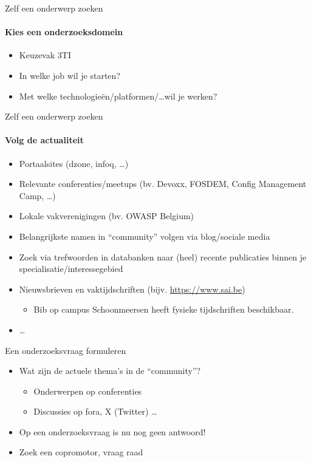 \documentclass[aspectratio=169]{beamer}
\begin{document}
\begin{frame}{Zelf een onderwerp zoeken}
  \framesubtitle{Kies een onderzoeksdomein}

  \begin{itemize}
    \item Keuzevak 3TI
    \item In welke job wil je starten?
    \item Met welke technologieën/platformen/\ldots wil je werken?
  \end{itemize}

\end{frame}

\begin{frame}{Zelf een onderwerp zoeken}
  \framesubtitle{Volg de actualiteit}

  \begin{itemize}
    \item Portaalsites (dzone, infoq, \ldots)
    \item Relevante conferenties/meetups (bv. Devoxx, FOSDEM, Config Management Camp, \ldots)
    \item Lokale vakverenigingen (bv. OWASP Belgium)
    \item Belangrijkste namen in ``community'' volgen via blog/sociale media
	\item Zoek via trefwoorden in databanken naar (heel) recente publicaties binnen je specialisatie/interessegebied
    \item Nieuwsbrieven en vaktijdschriften (bijv. \url{https://www.sai.be})
    \begin{itemize}
    	\item Bib op campus Schoonmeersen heeft fysieke tijdschriften beschikbaar.
    \end{itemize}
    \item \ldots
  \end{itemize}

\end{frame}

\begin{frame}{Een onderzoeksvraag formuleren}

  \begin{itemize}
    \item Wat zijn de actuele thema's in de ``community''?
          \begin{itemize}
            \item Onderwerpen op conferenties
            \item Discussies op fora, X (Twitter) \ldots
          \end{itemize}
    \item Op een onderzoeksvraag is nu nog geen antwoord!
    \item Zoek een copromotor, vraag raad
  \end{itemize}

\end{frame}
\end{document}
